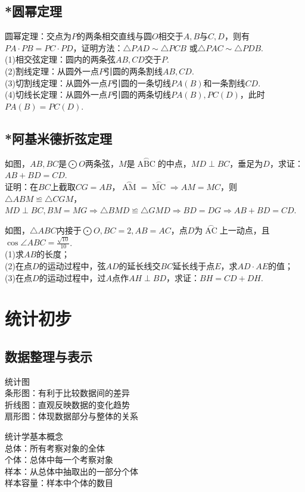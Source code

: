 \section{*圆幂定理}
\begin{theorem}
    圆幂定理：交点为$P$的两条相交直线与圆$O$相交于$A,B$与$C,D$，则有$PA·PB=PC·PD$，证明方法：$\triangle PAD \sim \triangle PCB$
    或$\triangle PAC \sim \triangle PDB$. \\
    (1)相交弦定理：圆内的两条弦$AB,CD$交于$P$.\\
    (2)割线定理：从圆外一点$P$引圆的两条割线$AB,CD$.\\
    (3)切割线定理：从圆外一点$P$引圆的一条切线$PA(B)$和一条割线$CD$. \\
    (4)切线长定理：从圆外一点$P$引圆的两条切线$PA(B),PC(D)$，此时$PA(B)=PC(D)$.
\end{theorem}
\clearpage
\section{*阿基米德折弦定理}
\begin{definition}
    如图，$AB,BC$是$\bigodot O$两条弦，$M$是$\mathop{ABC}\limits^{\frown}$的中点，$MD\perp BC$，垂足为$D$，求证：$AB+BD=CD$. \\
    证明：在$BC$上截取$CG=AB$，$\mathop{AM}\limits^{\frown}=\mathop{MC}\limits^{\frown} \Rightarrow AM=MC$，则$\triangle ABM \backcong \triangle CGM$，
    $MD\perp BC,BM=MG \Rightarrow \triangle BMD \backcong \triangle GMD \Rightarrow BD=DG \Rightarrow AB+BD=CD$.
\end{definition}
\begin{problem}
如图，$\triangle ABC$内接于$\bigodot O,BC=2,AB=AC$，点$D$为$\mathop{AC}\limits^{\frown}$上一动点，且$\cos \angle ABC=\frac{\sqrt{10}}{10}$. \\
(1)求$AB$的长度；\\
(2)在点$D$的运动过程中，弦$AD$的延长线交$BC$延长线于点$E$，求$AD·AE$的值；\\
(3)在点$D$的运动过程中，过$A$点作$AH\perp BD$，求证：$BH=CD+DH$.
\end{problem}
\clearpage
\chapter{统计初步}
\section{数据整理与表示}
\begin{theorem}
    统计图 \\
    条形图：有利于比较数据间的差异 \\
    折线图：直观反映数据的变化趋势 \\
    扇形图：体现数据部分与整体的关系
\end{theorem}
\begin{theorem}
    统计学基本概念 \\
    总体：所有考察对象的全体 \\
    个体：总体中每一个考察对象 \\
    样本：从总体中抽取出的一部分个体 \\
    样本容量：样本中个体的数目
\end{theorem}
\clearpage
